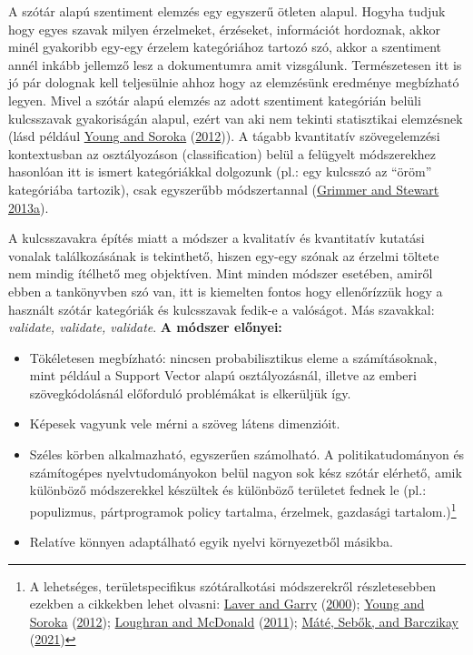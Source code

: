 \documentclass[
]{book}
\providecommand{\tightlist}{%
  \setlength{\itemsep}{0pt}\setlength{\parskip}{0pt}}
\begin{document}
A szótár alapú szentiment elemzés egy egyszerű ötleten alapul. Hogyha
tudjuk hogy egyes szavak milyen érzelmeket, érzéseket, információt
hordoznak, akkor minél gyakoribb egy-egy érzelem kategóriához tartozó
szó, akkor a szentiment annél inkább jellemző lesz a dokumentumra amit
vizsgálunk. Természetesen itt is jó pár dolognak kell teljesülnie ahhoz
hogy az elemzésünk eredménye megbízható legyen. Mivel a szótár alapú
elemzés az adott szentiment kategórián belüli kulcsszavak gyakoriságán
alapul, ezért van aki nem tekinti statisztikai elemzésnek (lásd például
\protect\hyperlink{ref-young2012affective}{Young and Soroka}
(\protect\hyperlink{ref-young2012affective}{2012})). A tágabb
kvantitatív szövegelemzési kontextusban az osztályozáson
(classification) belül a felügyelt módszerekhez hasonlóan itt is ismert
kategóriákkal dolgozunk (pl.: egy kulcsszó az ``öröm'' kategóriába
tartozik), csak egyszerűbb módszertannal
(\protect\hyperlink{ref-grimmer2013text}{Grimmer and Stewart 2013a}).

A kulcsszavakra építés miatt a módszer a kvalitatív és kvantitatív
kutatási vonalak találkozásának is tekinthető, hiszen egy-egy szónak az
érzelmi töltete nem mindig ítélhető meg objektíven. Mint minden módszer
esetében, amiről ebben a tankönyvben szó van, itt is kiemelten fontos
hogy ellenőrízzük hogy a használt szótár kategóriák és kulcsszavak
fedik-e a valóságot. Más szavakkal: \emph{validate, validate, validate}.
\textbf{A módszer előnyei:}

\begin{itemize}
\tightlist
\item
  Tökéletesen megbízható: nincsen probabilisztikus eleme a
  számításoknak, mint például a Support Vector alapú osztályozásnál,
  illetve az emberi szövegkódolásnál előforduló problémákat is
  elkerüljük így.
\item
  Képesek vagyunk vele mérni a szöveg látens dimenzióit.
\item
  Széles körben alkalmazható, egyszerűen számolható. A
  politikatudományon és számítogépes nyelvtudományokon belül nagyon sok
  kész szótár elérhető, amik különböző módszerekkel készültek és
  különböző területet fednek le (pl.: populizmus, pártprogramok policy
  tartalma, érzelmek, gazdasági tartalom.)\footnote{A lehetséges,
    területspecifikus szótáralkotási módszerekről részletesebben ezekben
    a cikkekben lehet olvasni:
    \protect\hyperlink{ref-laver2000estimating}{Laver and Garry}
    (\protect\hyperlink{ref-laver2000estimating}{2000});
    \protect\hyperlink{ref-young2012affective}{Young and Soroka}
    (\protect\hyperlink{ref-young2012affective}{2012});
    \protect\hyperlink{ref-loughran2011}{Loughran and McDonald}
    (\protect\hyperlink{ref-loughran2011}{2011});
    \protect\hyperlink{ref-muxe1tuxe92021}{Máté, Sebők, and Barczikay}
    (\protect\hyperlink{ref-muxe1tuxe92021}{2021})}
\item
  Relatíve könnyen adaptálható egyik nyelvi környezetből másikba.
\end{itemize}
\end{document}
